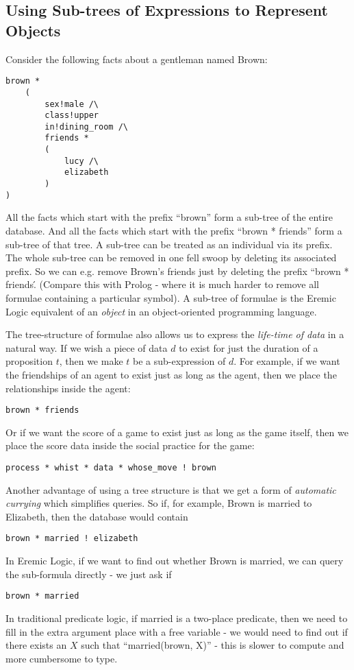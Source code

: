 \subsection{Using Sub-trees of Expressions to Represent Objects}
Consider the following facts about a gentleman named Brown:
\begin{verbatim}
brown *
    (
        sex!male /\
        class!upper
        in!dining_room /\
        friends *
        (
            lucy /\
            elizabeth
        )
)
\end{verbatim}
All the facts which start with the prefix ``brown'' form a sub-tree of the entire database.
And all the facts which start with the prefix ``brown * friends'' form a sub-tree of that tree.
A sub-tree can be treated as an individual via its prefix.
The whole sub-tree can be removed in one fell swoop by deleting its associated prefix.
So we can e.g. remove Brown's friends just by deleting the prefix ``brown * friends\'.
(Compare this with Prolog - where it is much harder to remove all formulae containing a particular symbol).
A sub-tree of formulae is the Eremic Logic equivalent of an \emph{object} in an object-oriented programming language.

The tree-structure of formulae also allows us to express the \emph{life-time of data} in a natural way. 
If we wish a piece of data $d$ to exist for just the duration of a proposition $t$, then we make $t$ be a sub-expression of $d$. 
For example, if we want the friendships of an agent to exist just as long as the agent, then we place the relationships inside the agent: 
\begin{verbatim}
brown * friends
\end{verbatim}
Or if we want the score of a game to exist just as long as the game itself, then we place the score data inside the social practice for the game: 
\begin{verbatim}
process * whist * data * whose_move ! brown
\end{verbatim}

Another advantage of using a tree structure is that we get a form of \emph{automatic currying} which simplifies queries.
So if, for example, Brown is married to Elizabeth, then the database would contain 
\begin{verbatim}
brown * married ! elizabeth
\end{verbatim}
In Eremic Logic, if we want to find out whether Brown is married, we can query the sub-formula directly -  we just ask if 
\begin{verbatim}
brown * married
\end{verbatim}
In traditional predicate logic, if married is a two-place predicate, then we need to fill in the extra argument place with a free variable - we would need to find out if there exists an $X$ such that ``married(brown, X)'' - this is slower to compute and more cumbersome to type. 

